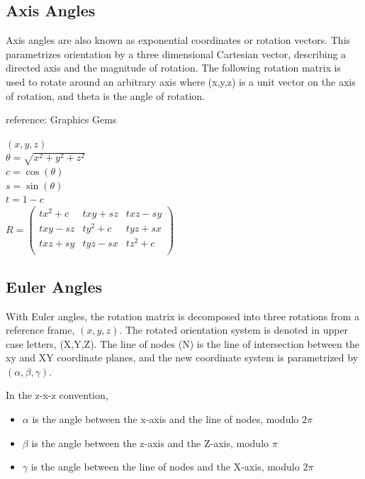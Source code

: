 \documentclass[12pt,a4,notitlepage]{report}
\renewcommand{\_}{\texttt{\symbol{95}}}
\newcommand{\<}{\texttt{\symbol{60}}}
\renewcommand{\>}{\texttt{\symbol{62}}}
\begin{document}
\subsection{Axis Angles}

Axis angles are also known as exponential coordinates or rotation vectors. This parametrizes orientation by a three dimensional Cartesian vector, describing a directed axis and the magnitude of rotation. The following rotation matrix is used to rotate around an arbitrary axis where (x,y,z) is a unit vector on the axis of rotation, and theta is the angle of rotation.

{reference: Graphics Gems}

$(x,y,z)$\\

$\theta = \sqrt{x^2 + y^2 + z^2}$\\

$c = \cos(\theta)$\\
$s = \sin(\theta)$\\
$t = 1-c $\\

$R =
\left( \begin{array}{ccc}
      tx^2+c & txy+sz & txz-sy\\
		txy-sz & ty^2+c & tyz+sx\\
		txz+sy & tyz-sx & tz^2+c\\
\end{array} \right)$

\subsection{Euler Angles}

With Euler angles, the rotation matrix is decomposed into three rotations from a reference frame, $(x,y,z)$. The rotated orientation system is denoted in upper case letters, (X,Y,Z). The line of nodes (N) is the line of intersection between the xy and XY coordinate planes, and the new coordinate system is parametrized by $(\alpha,\beta,\gamma)$.

In the z-x-z convention,

\begin{itemize}
\item $\alpha$ is the angle between the x-axis and the line of nodes, modulo $2\pi$
\item $\beta$ is the angle between the z-axis and the Z-axis, modulo $\pi$
\item $\gamma$ is the angle between the line of nodes and the X-axis, modulo $2\pi$
\end{itemize}
\end{document}
